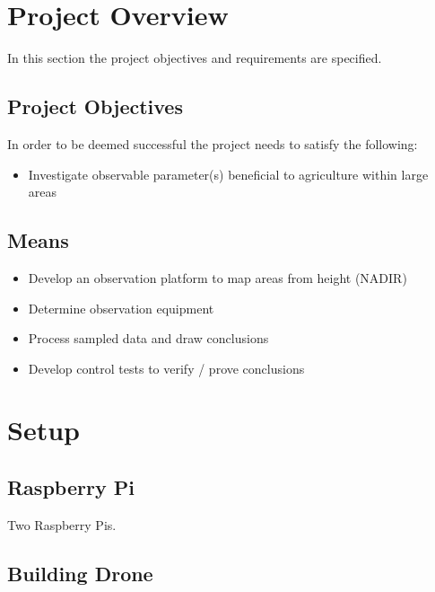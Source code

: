 \section{Project Overview}

In this section the project objectives and requirements are specified.

\subsection{Project Objectives}
In order to be deemed successful the project needs to satisfy the following:

\begin{itemize}
    \item Investigate observable parameter(s) beneficial to agriculture within large areas
\end{itemize}

\subsection{Means}

\begin{itemize}
    \item Develop an observation platform to map areas from height (NADIR)
    \item Determine observation equipment
    \item Process sampled data and draw conclusions
    \item Develop control tests to verify / prove conclusions
\end{itemize}

\section{Setup}

\subsection{Raspberry Pi}

Two Raspberry Pis.

\subsection{Building Drone}

